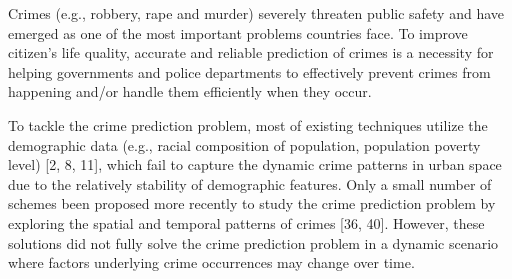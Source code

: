 Crimes (e.g., robbery, rape and murder) severely threaten public
safety and have emerged as one of the most important problems
countries face. To improve citizen’s life quality, accurate and reliable
prediction of crimes is a necessity for helping governments and
police departments to effectively prevent crimes from happening
and/or handle them efficiently when they occur.

\noindent To tackle the crime prediction problem, most of existing techniques utilize the demographic data (e.g., racial composition of
population, population poverty level)\cite{b1} [2, 8, 11], which fail to capture the dynamic crime patterns in urban space due to the relatively
stability of demographic features. Only a small number of schemes
been proposed more recently to study the crime prediction problem
by exploring the spatial and temporal patterns of crimes [36, 40].
However, these solutions did not fully solve the crime prediction
problem in a dynamic scenario where factors underlying crime
occurrences may change over time.

